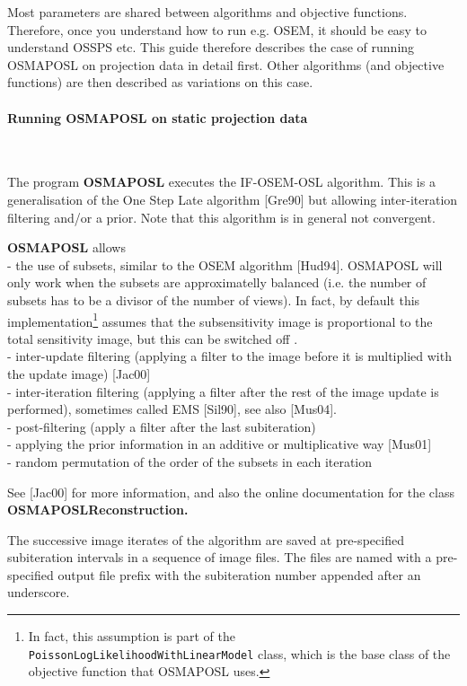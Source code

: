 \documentclass{article}
\newcommand{\tab}{\hspace{5mm}}
\newcommand{\subsubsubsection}[1]{\paragraph{#1}\mbox{} \\}
\begin{document}
{Most parameters are shared between algorithms and objective functions. Therefore,
once you understand how to run e.g. OSEM, it should be easy to understand OSSPS etc.
This guide therefore describes the case of running OSMAPOSL on projection data in detail
first. Other algorithms (and objective functions) are then described as variations on this
case.

{ \subsubsubsection{Running OSMAPOSL on static projection data}
}
\label{sec:OSMAPOSL}

The program \textbf{OSMAPOSL} executes the IF-OSEM-OSL algorithm. 
This is a generalisation of the One Step Late algorithm [Gre90] but allowing
inter-iteration filtering and/or a prior. Note that this 
algorithm is in general not convergent.

\textbf{OSMAPOSL} 
allows \\
-\tab 
the use of subsets, similar to the OSEM algorithm [Hud94]. OSMAPOSL
will only work when the subsets are approximatelly balanced (i.e.
the number of subsets has to be a divisor of the number of views).
In fact, by default this implementation\footnote{In fact, this assumption
is part of the \texttt{PoissonLogLikelihoodWithLinearModel} class, which is
the base class of the objective function that OSMAPOSL uses.} assumes that the 
subsensitivity image is proportional to the total sensitivity image,
but this can be switched off .\\
-\tab 
inter-update filtering (applying a filter to the image before 
it is multiplied with the update image) [Jac00]\\
-\tab 
inter-iteration filtering (applying a filter after the rest of 
the image update is performed), sometimes called EMS [Sil90], 
see also [Mus04].\\
-\tab 
post-filtering (apply a filter after the last subiteration)\\
-\tab 
applying the prior information in an additive or multiplicative 
way [Mus01]\\
-\tab 
random permutation of the order of the subsets in each iteration


See [Jac00] for more information, and also the online documentation 
for the class \textbf{OSMAPOSLReconstruction.}


The successive image iterates of the algorithm are saved at pre-specified 
subiteration intervals in a sequence of image files. The files 
are named with a pre-specified output file prefix with the subiteration 
number appended after an underscore.


}
\end{document}
